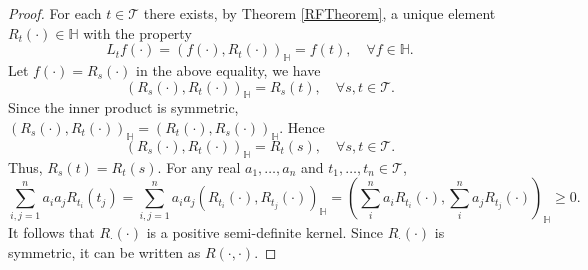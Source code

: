 \documentclass[11pt]{article}
\theoremstyle{plain}
\theoremstyle{definition}
\theoremstyle{remark}
\begin{document}
\begin{proof}
For each $t\in \mathcal T$ there exists, by Theorem \ref{RFTheorem}, a unique element $R_t (\cdot) \in \mathbb{H}$ with the property
\begin{equation*}
    L_t f(\cdot) = (f(\cdot), R_t(\cdot) )_{\mathbb{H}}= f(t), \quad \forall f\in \mathbb{H}.
\end{equation*}
Let $f(\cdot)=R_s(\cdot)$ in the above equality, we have
\begin{equation*}
    (R_s(\cdot), R_t(\cdot) )_{\mathbb{H}}=R_s(t),\quad \forall s,t \in \mathcal{T}.
\end{equation*}
Since the inner product is symmetric, $(R_s(\cdot), R_t(\cdot) )_{\mathbb{H}}=(R_t(\cdot), R_s(\cdot) )_{\mathbb{H}}$. 
Hence
\begin{equation*}
    (R_s(\cdot), R_t(\cdot) )_{\mathbb{H}}=R_t(s),\quad \forall s,t \in \mathcal{T}.
\end{equation*}
Thus, $R_s(t)=R_t(s)$.
For any real $a_1,\ldots, a_n$ and $t_1,\ldots, t_n \in \mathcal{T}$,
\begin{equation*}
    \sum_{i,j=1}^n a_i a_j R_{t_i}(t_j) =
    \sum_{i,j=1}^n a_i a_j \left(R_{t_i}(\cdot), R_{t_j}(\cdot) \right)_{\mathbb{H}}
    =
      \left(\sum_{i}^n a_i R_{t_i}(\cdot), \sum_{i}^n a_j R_{t_j}(\cdot) \right)_{\mathbb{H}}
      \geq 0.
\end{equation*}
It follows that $R_{\cdot}(\cdot)$ is a positive semi-definite kernel.
Since $R_{\cdot}(\cdot)$ is symmetric, it can be written as $R(\cdot,\cdot)$.
\end{proof}
\end{document}
